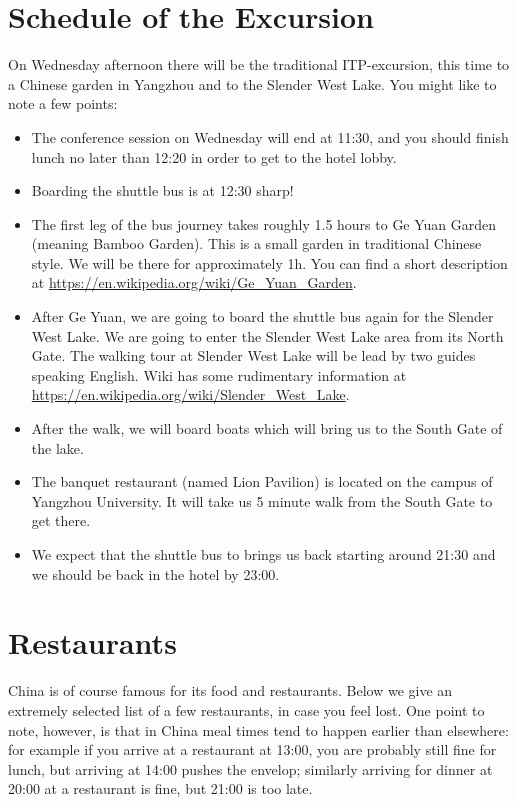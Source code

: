\documentclass[11pt]{report}
\begin{document}
\section{Schedule of the Excursion\label{excursion}}

On Wednesday afternoon there will be the traditional
ITP-excursion, this time to a Chinese garden in Yangzhou and
to the Slender West Lake. You might like to note a few points:

\begin{itemize}
\item The conference session on Wednesday will end at 11:30,
      and you should finish lunch no later than 12:20 in order
      to get to the hotel lobby.
\item Boarding the shuttle bus is at 12:30 sharp!
\item The first leg of the bus journey takes roughly 1.5 hours
  to Ge Yuan Garden (meaning Bamboo Garden). This is a
  small garden in traditional Chinese style. We will be there
  for approximately 1h. You can find a short description at
  \url{https://en.wikipedia.org/wiki/Ge_Yuan_Garden}. 
  
\item After Ge Yuan, we are going to board the shuttle bus again 
  for the Slender West Lake. We are going to enter the Slender West 
  Lake area from its North Gate. The walking tour at Slender 
  West Lake will be lead by two guides speaking English.
  Wiki has some rudimentary information at
  \url{https://en.wikipedia.org/wiki/Slender_West_Lake}.
\item After the walk, we will board boats which will bring
  us to the South Gate of the lake.
\item The banquet restaurant (named Lion 
  Pavilion) is located on the campus 
  of Yangzhou University. It  will take us 5 minute walk 
    from the South Gate to get there.
\item We expect that the shuttle bus to brings us back starting 
  around 21:30 and we should be back in the hotel by 23:00.
\end{itemize}

\section{Restaurants}

China is of course famous for its food and restaurants. Below
we give an extremely selected list of a few restaurants, in
case you feel lost. One point to note, however, is that in
China meal times tend to happen earlier than elsewhere: for
example if you arrive at a restaurant at 13:00, you are
probably still fine for lunch, but arriving at 14:00 pushes
the envelop; similarly arriving for dinner at 20:00 at a
restaurant is fine, but 21:00 is too late. 
\end{document}
